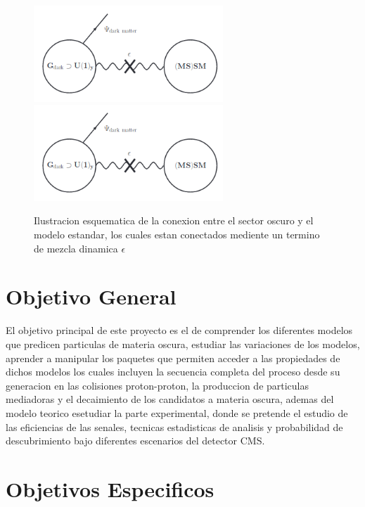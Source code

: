 \begin{figure}
\begin{center}
  \includegraphics[width=2.8in]{sketch_darksector.png}
  \includegraphics[width=2.8in]{sketch_darksector.png}
  \caption{Ilustracion esquematica de la conexion entre el sector oscuro y el modelo estandar, los cuales estan conectados mediente un termino de mezcla dinamica $\epsilon$}
  \label{fig:AMS_positron}
\end{center}
\end{figure}


\chapter{Objetivo General}

El objetivo principal de este proyecto es el de comprender los diferentes modelos que predicen particulas de materia oscura, estudiar las variaciones de los modelos,  aprender a manipular los paquetes que permiten acceder a las propiedades de dichos modelos los cuales incluyen la secuencia completa del proceso desde su generacion en las colisiones proton-proton, la produccion de particulas mediadoras y el decaimiento de los candidatos a materia oscura, ademas del modelo teorico esetudiar la parte experimental, donde se pretende el estudio de las eficiencias de las senales, tecnicas estadisticas de analisis y probabilidad de descubrimiento bajo diferentes escenarios del detector CMS. 

\chapter{Objetivos Especificos}

